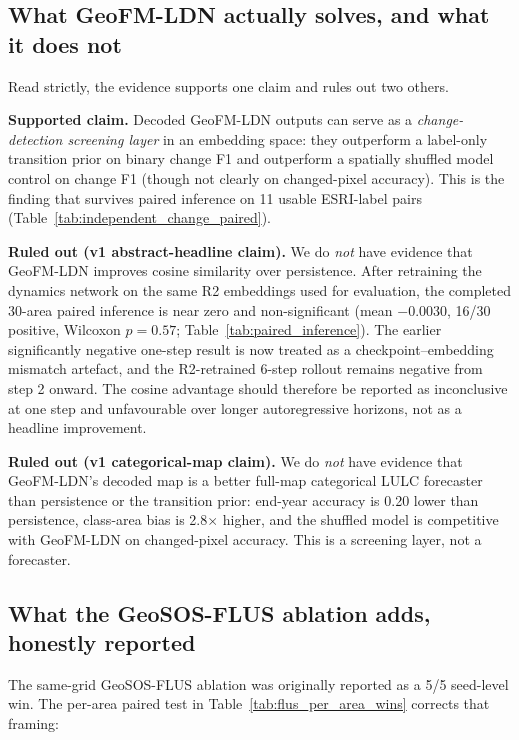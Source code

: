 \documentclass{article}
\begin{document}
\subsection{What GeoFM-LDN actually solves, and what it does not}

Read strictly, the evidence supports one claim and rules out two others.

\textbf{Supported claim.} Decoded GeoFM-LDN outputs can serve as a \emph{change-detection screening layer} in an embedding space: they outperform a label-only transition prior on binary change F1 and outperform a spatially shuffled model control on change F1 (though not clearly on changed-pixel accuracy). This is the finding that survives paired inference on 11 usable ESRI-label pairs (Table~\ref{tab:independent_change_paired}).

\textbf{Ruled out (v1 abstract-headline claim).} We do \emph{not} have evidence that GeoFM-LDN improves cosine similarity over persistence. After retraining the dynamics network on the same R2 embeddings used for evaluation, the completed 30-area paired inference is near zero and non-significant (mean $-0.0030$, 16/30 positive, Wilcoxon $p=0.57$; Table~\ref{tab:paired_inference}). The earlier significantly negative one-step result is now treated as a checkpoint--embedding mismatch artefact, and the R2-retrained 6-step rollout remains negative from step 2 onward. The cosine advantage should therefore be reported as inconclusive at one step and unfavourable over longer autoregressive horizons, not as a headline improvement.

\textbf{Ruled out (v1 categorical-map claim).} We do \emph{not} have evidence that GeoFM-LDN's decoded map is a better full-map categorical LULC forecaster than persistence or the transition prior: end-year accuracy is 0.20 lower than persistence, class-area bias is 2.8$\times$ higher, and the shuffled model is competitive with GeoFM-LDN on changed-pixel accuracy. This is a screening layer, not a forecaster.

\subsection{What the GeoSOS-FLUS ablation adds, honestly reported}

The same-grid GeoSOS-FLUS ablation was originally reported as a 5/5 seed-level win. The per-area paired test in Table~\ref{tab:flus_per_area_wins} corrects that framing:
\end{document}
